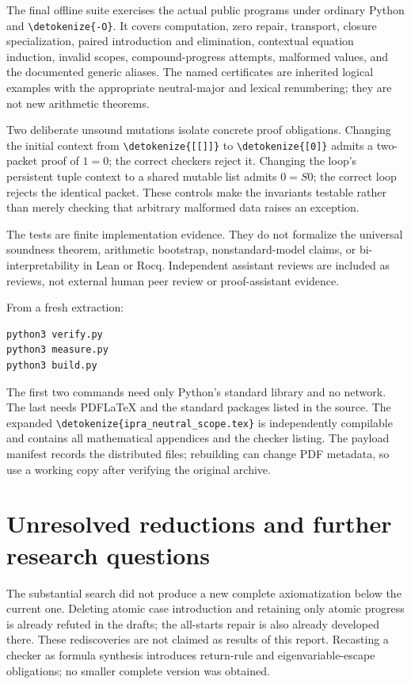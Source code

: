 \documentclass[11pt,letterpaper]{article}
\theoremstyle{definition}\newtheorem{definition}[theorem]{Definition}
\theoremstyle{remark}\newtheorem{remark}[theorem]{Remark}
\newcommand{\file}[1]{\expandafter\nolinkurl\expandafter{\detokenize{#1}}}
\begin{document}
The final offline suite exercises the actual public programs under ordinary
Python and \file{-O}. It covers computation, zero repair, transport, closure
specialization, paired introduction and elimination, contextual equation
induction, invalid scopes, compound-progress attempts, malformed values,
and the documented generic aliases. The named certificates are inherited
logical examples with the appropriate neutral-major and lexical renumbering;
they are not new arithmetic theorems.

Two deliberate unsound mutations isolate concrete proof obligations.
Changing the initial context from \file{[[]]} to \file{[0]} admits a two-packet
proof of $1=0$; the correct checkers reject it. Changing the loop's persistent
tuple context to a shared mutable list admits $0=S0$; the correct loop rejects
the identical packet. These controls make the invariants testable rather than
merely checking that arbitrary malformed data raises an exception.



The tests are finite implementation evidence. They do not formalize the
universal soundness theorem, arithmetic bootstrap, nonstandard-model claims,
or bi-interpretability in Lean or Rocq. Independent assistant reviews are
included as reviews, not external human peer review or proof-assistant evidence.

From a fresh extraction:
\begin{lstlisting}
python3 verify.py
python3 measure.py
python3 build.py
\end{lstlisting}
The first two commands need only Python's standard library and no network.
The last needs PDFLaTeX and the standard packages listed in the source. The
expanded \file{ipra_neutral_scope.tex} is independently compilable and contains
all mathematical appendices and the checker listing. The payload manifest
records the distributed files; rebuilding can change PDF metadata, so use a
working copy after verifying the original archive.

\section{Unresolved reductions and further research questions}

The substantial search did not produce a new complete axiomatization below
the current one. Deleting atomic case introduction and retaining only atomic
progress is already refuted in the drafts; the all-starts repair is also
already developed there. These rediscoveries are not claimed as results of
this report. Recasting a checker as formula synthesis introduces return-rule
and eigenvariable-escape obligations; no smaller complete version was obtained.
\end{document}
